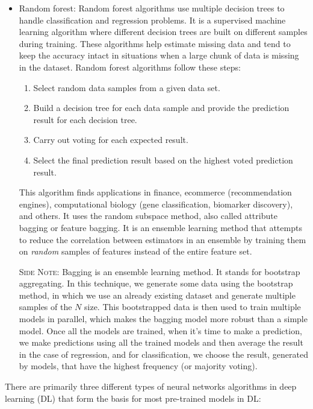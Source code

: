 \documentclass[11pt]{article}
\begin{document}
\begin{itemize}
\item Random forest: Random forest algorithms use multiple decision trees to handle classification and regression problems. It is a supervised machine learning algorithm where different decision trees are built on different samples during training. These algorithms help estimate missing data and tend to keep the accuracy intact in situations when a large chunk of data is missing in the dataset. Random forest algorithms follow these steps:

\begin{enumerate} 
\item Select random data samples from a given data set.
\item Build a decision tree for each data sample and provide the prediction result for each decision tree.
\item Carry out voting for each expected result.
\item  Select the final prediction result based on the highest voted prediction result.
\end{enumerate} 
This algorithm finds applications in finance, ecommerce (recommendation engines), computational biology (gene classification, biomarker discovery), and others. It uses the random subspace method, also called attribute bagging or feature bagging. It is an ensemble learning method that attempts to reduce the correlation between estimators in an ensemble by training them on \emph{random} samples of features instead of the entire feature set.

\textsc{Side Note:} Bagging is an ensemble learning method. It stands for bootstrap aggregating. In this technique, we generate some data using the bootstrap method, in which we use an already existing dataset and generate multiple samples of the $N$ size. This bootstrapped data is then used to train multiple models in parallel, which makes the bagging model more robust than a simple model. Once all the models are trained, when it’s time to make a prediction, we make predictions using all the trained models and then average the result in the case of regression, and for classification, we choose the result, generated by models, that have the highest frequency (or majority voting).



\end{itemize} 

There are primarily three different types of neural networks algorithms in deep learning (DL) that form the basis for most pre-trained models in DL:
\end{document}
